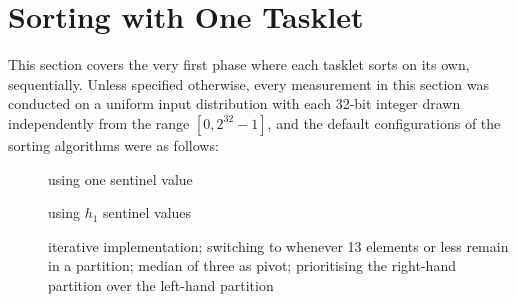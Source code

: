 \section{Sorting with One Tasklet}

This section covers the very first phase where each tasklet sorts on its own, \ie{} sequentially.
Unless specified otherwise, every measurement in this section was conducted on a uniform input distribution with each 32-bit integer drawn independently from the range \([0, 2^{32} - 1]\), and the default configurations of the sorting algorithms were as follows:
\begin{description}
	\item[\IS{}]
	using one sentinel value

	\item[\ShS{}]
	using \(h_1\) sentinel values

	\item[\QS{}]
	iterative implementation;
	switching to \IS{} whenever 13 elements or less remain in a partition;
	median of three as pivot;
	prioritising the right-hand partition over the left-hand partition
\end{description}




